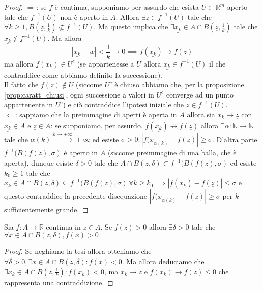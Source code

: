 \documentclass[openany, italian]{book}
\begin{document}
\begin{proof} \hspace{1em} \newline
$\boxed{\Rightarrow}$: se $f$ è continua, supponiamo per assurdo che esista $U \subset \mathbb{R}^m$ aperto tale che $f^{-1}(U)$ non è aperto in $A$. Allora $\exists z \in f^{-1}(U)$ tale che $\forall k \geq 1, B(\underline{z}, \frac{1}{k}) \not\subset f^{-1}(U)$. Ma questo implica che $\exists \underline{x_k} \in A \cap B(\underline{z}, \frac{1}{k})$ tale che $\underline{x_k} \not\in f^{-1}(U)$. Ma allora 
$$
|\underline{x_k} - \underline{w}| < \frac{1}{k} \to 0 \implies f(\underline{x_k}) \to f(\underline{z})
$$
ma allora $f(x_k) \in U^c$ (se appartenesse a $U$ allora $\underline{x_k} \in f^{-1}(U)$ il che contraddice come abbiamo definito la successione). \\ Il fatto che $f(z) \not\in U$ (siccome $U^c$ è chiuso abbiamo che, per la proposizione \ref{prop:caratt_chiusi}, ogni successione a valori in $U^c$ converge ad un punto appartenente in $U^c$) e ciò contraddice l'ipotesi iniziale che $z \in f^{-1}(U)$. \\
$\boxed{\Leftarrow}$: sappiamo che la preimmagine di aperti è aperta in $A$ allora sia $\underline{x_k} \to \underline{z}$ con $\underline{x_k} \in A$ e $\underline{z} \in A$: se supponiamo, per assurdo, $f(\underline{x_k}) \not\to f(\underline{z})$ allora $\exists \alpha: \mathbb{N} \to \mathbb{N}$ tale che $\alpha(k) \stackrel{k \to +\infty}{\to} +\infty$ ed esiste $\sigma > 0: |f(\underline{x}_{\alpha(k)} - f(\underline{z})| \geq \sigma$. D'altra parte $f^{-1}(B(f(z), \sigma)$ è aperto in $A$ (siccome preimmagine di una balla, che è aperta), dunque esiste $\delta > 0$ tale che $A \cap B(z, \delta) \subset f^{-1}(B(f(z), \sigma)$ ed esiste $k_0 \geq 1$ tale che $x_k \in A \cap B(z, \delta) \subseteq f^{-1}(B(f(z), \sigma) \, \forall k \geq k_0 \implies |f(\underline{x_k}) - f(\underline{z})| \leq \sigma$ e questo contraddice la precedente disequazione $|f(\underline{x}_{\alpha(k)}-f(\underline{z})| \geq \sigma$ per $k$ sufficientemente grande.
\end{proof}
\begin{theorem}
Sia $f: A \to \mathbb{R}$ continua in $z \in A$. Se $f(z) > 0$ allora $\exists \delta > 0$ tale che $\forall x \in A \cap B(z, \delta), f(x) > 0$
\end{theorem}
\begin{proof}
Se neghiamo la tesi allora otteniamo che $\forall \delta > 0, \exists x \in A \cap B(z, \delta): f(x) < 0$. Ma allora deduciamo che $\exists \underline{x_k} \in A \cap B(z, \frac{1}{k}): f(x_k) <0$, ma $\underline{x_k} \to z$ e $f(x_k) \to f(z) \leq 0$ che rappresenta una contraddizione.
\end{proof}
\end{document}
